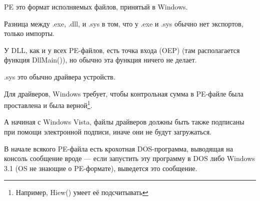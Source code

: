\label{win32_pe}

\acs{PE} это формат исполняемых файлов, принятый в Windows.

Разница между .exe, .dll, и .sys в том, что у .exe и .sys обычно нет экспортов, только импорты.

У \ac{DLL}, как и у всех PE-файлов, есть точка входа (\ac{OEP})
(там располагается функция DllMain()), но обычно эта функция ничего не делает.

.sys это обычно драйвера устройств.

Для драйверов, Windows требует, чтобы контрольная сумма в PE-файле была проставлена и была верной\footnote{Например, Hiew() умеет её подсчитывать}.

А начиная с Windows Vista, файлы драйверов должны быть также подписаны при помощи электронной подписи, иначе они не будут загружаться.


В начале всякого PE-файла есть крохотная DOS-программа,
выводящая на консоль сообщение вроде  --- если запустить эту программу в DOS либо Windows 3.1 (\ac{OS} не знающие о PE-формате), 
выведется это сообщение.


